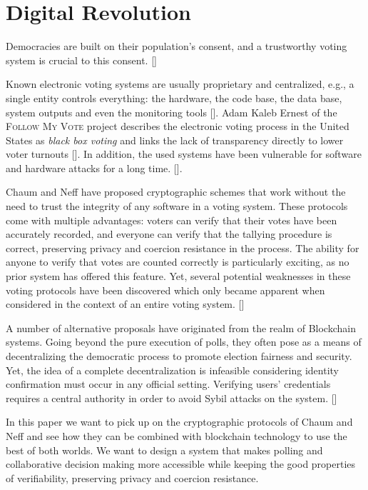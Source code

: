 
\section{Digital Revolution}\label{sec:motivation}

Democracies are built on their population’s consent, and a trustworthy voting system is crucial to this consent. [\cite{Naveen05}]\par

Known electronic voting systems are usually proprietary and centralized, e.g., a single entity controls everything: the hardware, the code base, the data base, system outputs and even the monitoring tools [\cite{NOIZAT2014}]. Adam Kaleb Ernest of the \textsc{Follow My Vote} project describes the electronic voting process in the United States as \textit{black box voting} and links the lack of transparency directly to lower voter turnouts [\cite{ERNEST2014}]. In addition, the used systems have been vulnerable for software and hardware attacks for a long time. [\cite{VARSHNEYA2015}].\par

Chaum and Neff have proposed cryptographic schemes that work without the need to trust the integrity of any software in a voting system. These protocols come with multiple advantages: voters can verify that their votes have been accurately recorded, and everyone can verify that the tallying procedure is correct, preserving privacy and coercion resistance in the
process. The ability for anyone to verify that votes are counted correctly is particularly exciting, as no prior system has offered this feature. Yet,  several potential weaknesses in these voting protocols have been discovered which only became apparent when considered in the context of an entire voting system. [\cite{Naveen05}] \par

A number of alternative proposals have originated from the realm of Blockchain systems. Going beyond the pure execution of polls, they often pose as a means of decentralizing the democratic process to promote election fairness and security. Yet, the idea of a complete decentralization is infeasible considering identity confirmation must occur in any official setting. Verifying users’ credentials requires a central authority in order to avoid Sybil attacks on the system. [\cite{VARSHNEYA2015}] \par

In this paper we want to pick up on the cryptographic protocols of Chaum and Neff and see how they can be combined with blockchain technology to use the best of both worlds. We want to design a system that makes polling and collaborative decision making more accessible while keeping the good properties of verifiability, preserving privacy and coercion resistance.\par